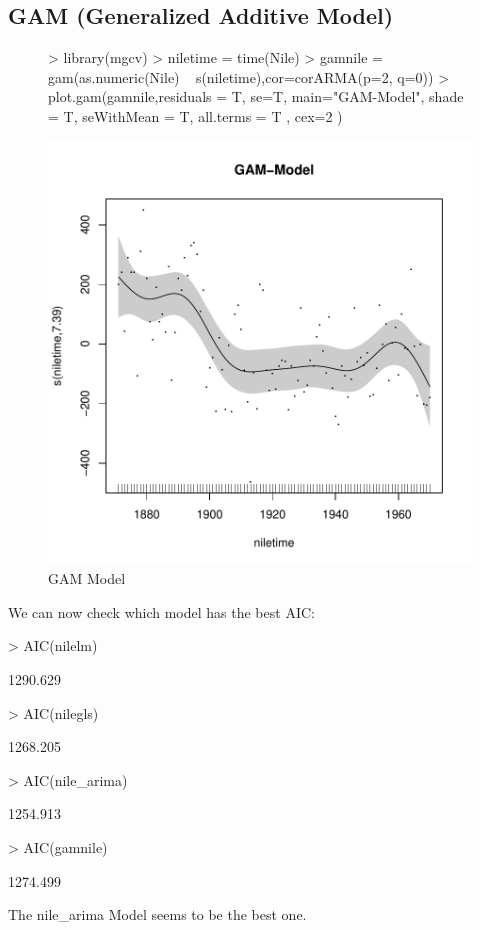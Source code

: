 \documentclass[10pt, a4paper]{article} %
\begin{document}
\subsection{GAM (Generalized Additive Model)}
\begin{figure}[H]
\centering
\begin{Schunk}
\begin{Sinput}
> library(mgcv)
> niletime = time(Nile)
> gamnile = gam(as.numeric(Nile) ~ s(niletime),cor=corARMA(p=2, q=0))
> plot.gam(gamnile,residuals = T, se=T, main="GAM-Model", shade = T,
          seWithMean = T, all.terms = T , cex=2 )
\end{Sinput}
\end{Schunk}
\includegraphics{FINAL_VERSION-106}
\caption{GAM Model}
\end{figure}

\noindent We can now check which model has the best AIC:
\begin{Schunk}
\begin{Sinput}
> AIC(nilelm)
\end{Sinput}
\begin{Soutput}
[1] 1290.629
\end{Soutput}
\begin{Sinput}
> AIC(nilegls)
\end{Sinput}
\begin{Soutput}
[1] 1268.205
\end{Soutput}
\begin{Sinput}
> AIC(nile_arima)
\end{Sinput}
\begin{Soutput}
[1] 1254.913
\end{Soutput}
\begin{Sinput}
> AIC(gamnile)
\end{Sinput}
\begin{Soutput}
[1] 1274.499
\end{Soutput}
\end{Schunk}
\noindent The nile\_arima Model seems to be the best one.
\end{document}
